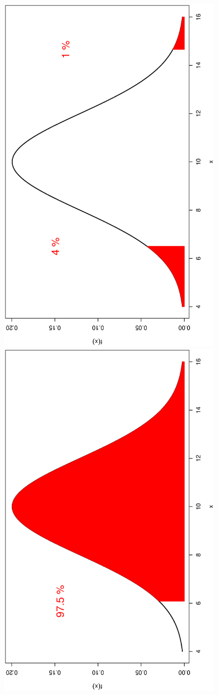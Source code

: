 \documentclass[captions=tableheading, 12pt, headings=small, parskip=half]{scrartcl}
\begin{document}
\begin{figure}[H]
\begin{minipage}{0.49\columnwidth}
	\end{minipage}
\hfill
	\begin{minipage}{0.49\columnwidth}
		\includegraphics[height = \columnwidth, angle = -90]{Code1/CV3.eps}
		\includegraphics[height = \columnwidth, angle = -90]{Code1/CV4.eps}
	\end{minipage}
\end{figure}
\end{document}
